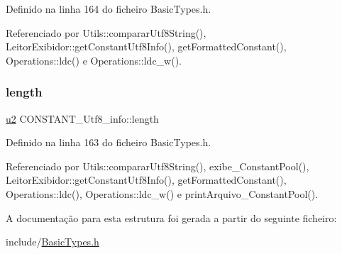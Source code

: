 Definido na linha 164 do ficheiro Basic\+Types.\+h.



Referenciado por Utils\+::comparar\+Utf8\+String(), Leitor\+Exibidor\+::get\+Constant\+Utf8\+Info(), get\+Formatted\+Constant(), Operations\+::ldc() e Operations\+::ldc\+\_\+w().

\mbox{\label{structCONSTANT__Utf8__info_a712975144ad624052a94f4a2ebdb954e}} 
\subsubsection{\texorpdfstring{length}{length}}
{\footnotesize\ttfamily \hyperlink{BasicTypes_8h_a732cde1300aafb73b0ea6c2558a7a54f}{u2} C\+O\+N\+S\+T\+A\+N\+T\+\_\+\+Utf8\+\_\+info\+::length}



Definido na linha 163 do ficheiro Basic\+Types.\+h.



Referenciado por Utils\+::comparar\+Utf8\+String(), exibe\+\_\+\+Constant\+Pool(), Leitor\+Exibidor\+::get\+Constant\+Utf8\+Info(), get\+Formatted\+Constant(), Operations\+::ldc(), Operations\+::ldc\+\_\+w() e print\+Arquivo\+\_\+\+Constant\+Pool().



A documentação para esta estrutura foi gerada a partir do seguinte ficheiro\+:\begin{DoxyCompactItemize}
\item 
include/\hyperlink{BasicTypes_8h}{Basic\+Types.\+h}\end{DoxyCompactItemize}
